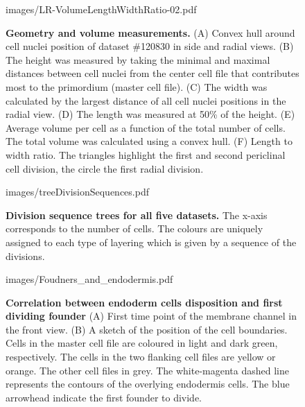 \documentclass[11pt,a4paper, draft]{article}
\begin{document}
%
\clearpage
%
\begin{figure}[htbp]
	\begin{center}
	\begin{overpic}[width=1.\linewidth]{images/LR-VolumeLengthWidthRatio-02.pdf}
	\end{overpic}
\caption[Geometry and volume measurements.]
{{\bf Geometry and volume measurements.} (A) Convex hull around cell nuclei position of dataset \#120830 in side and radial views. (B) The height was measured by taking the minimal and maximal distances between cell nuclei from the center cell file that contributes most to the primordium (master cell file). (C) The width was calculated by the largest distance of all cell nuclei positions in the radial view. (D) The length was measured at 50\% of the height. (E) Average volume per cell as a function of the total number of cells. The total volume was calculated using a convex hull. (F) Length to width ratio. The triangles highlight the first and second periclinal cell division, the circle the first radial division.}
	\label{fig:VLWR}
	\end{center}
\end{figure}
%
\clearpage
%
\begin{figure}[htbp]
	\begin{center}
		\begin{overpic}[width=1.\linewidth]{images/treeDivisionSequences.pdf}
		\end{overpic}
\caption[Division sequence trees for all five datasets.]
{
{\bf Division sequence trees for all five datasets.} The x-axis corresponds to the number of cells. The colours are uniquely assigned to each type of layering which is given by a sequence of the divisions.}
	\label{fig:treeDivisionSequences}
	\end{center}
\end{figure}
%
\clearpage
%
\begin{figure}[htbp]
	\begin{center}
	\begin{overpic}[width=0.5\linewidth]{images/Foudners_and_endodermis.pdf}
	\end{overpic}
\caption[Correlation between endoderm cells disposition and first dividing founder.]
{{\bf Correlation between endoderm cells disposition and first dividing founder} (A) First time point of the membrane channel in the front view. (B) A sketch of the position of the cell boundaries. Cells in the master cell file are coloured in light and dark green, respectively. The cells in the two flanking cell files are yellow or orange. The other cell files in grey. The white-magenta dashed line represents the contours of the overlying endodermis cells. The blue arrowhead indicate the first founder to divide.}
	\label{fig:foundersendo}
	\end{center}
\end{figure}
%
\clearpage
\end{document}
